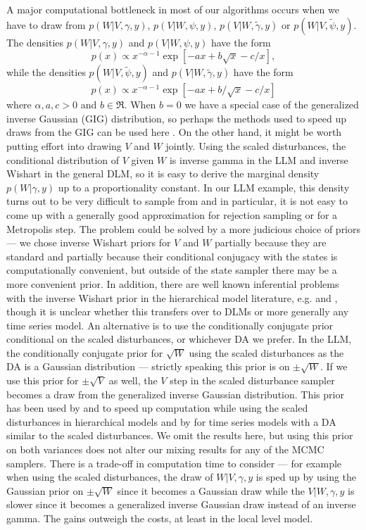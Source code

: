 \documentclass[12pt]{article}
\begin{document}
A major computational bottleneck in most of our algorithms occurs when we have to draw from $p(W|V,\gamma,y)$, $p(V|W,\psi,y)$, $p(V|W,\tilde{\gamma},y)$ or $p(W|V,\tilde{\psi},y)$. The densities $p(W|V,\gamma,y)$ and $p(V|W,\psi,y)$ have the form
\[
p(x)\propto x^{-\alpha-1}\exp\left[-ax + b\sqrt{x} - c/x\right],
\]
while the densities $p(W|V,\tilde{\psi},y)$ and $p(V|W,\tilde{\gamma},y)$ have the form
\[
p(x)\propto x^{-\alpha-1}\exp\left[ -ax + b/\sqrt{x} -c/x\right]
\]
where $\alpha,a,c>0$ and $b\in\Re$. When $b=0$ we have a special case of the generalized inverse Gaussian (GIG) distribution, so perhaps the methods used to speed up draws from the GIG can be used here \citep{jorgensen1982statistical,dagpunar1989easily,devroye2012random}. On the other hand, it might be worth putting effort into drawing $V$ and $W$ jointly. Using the scaled disturbances, the conditional distribution of $V$ given $W$ is inverse gamma in the LLM and inverse Wishart in the general DLM, so it is easy to derive the marginal density $p(W|\gamma,y)$ up to a proportionality constant. In our LLM example, this density turns out to be very difficult to sample from and in particular, it is not easy to come up with a generally good approximation for rejection sampling or for a Metropolis step. The problem could be solved by a more judicious choice of priors --- we chose inverse Wishart priors for $V$ and $W$ partially because they are standard and partially because their conditional conjugacy with the states is computationally convenient, but outside of the state sampler there may be a more convenient prior. In addition, there are well known inferential problems with the inverse Wishart prior in the hierarchical model literature, e.g. \citet{gelman2006prior}\blind and \citet{alvarez2014cov}\fi, though it is unclear whether this transfers over to DLMs or more generally any time series model. An alternative is to use the conditionally conjugate prior conditional on the scaled disturbances, or whichever DA we prefer. In the LLM, the conditionally conjugate prior for $\sqrt{W}$ using the scaled disturbances as the DA is a Gaussian distribution --- strictly speaking this prior is on $\pm \sqrt{W}$. If we use this prior for $\pm\sqrt{V}$ as well, the $V$ step in the scaled disturbance sampler becomes a draw from the generalized inverse Gaussian distribution. This prior has been used by \citet{fruhwirth2011bayesian} and \citet{fruhwirth2008bayesian} to speed up computation while using the scaled disturbances in hierarchical models and by \citet{fruhwirth2010stochastic} for time series models with a DA similar to the scaled disturbances. We omit the results here, but using this prior on both variances does not alter our mixing results for any of the MCMC samplers. There is a trade-off in computation time to consider --- for example when using the scaled disturbances, the draw of $W|V,\gamma,y$ is sped up by using the Gaussian prior on $\pm\sqrt{W}$ since it becomes a Gaussian draw while the $V|W,\gamma,y$ is slower since it becomes a generalized inverse Gaussian draw instead of an inverse gamma. The gains outweigh the costs, at least in the local level model. 
\end{document}
